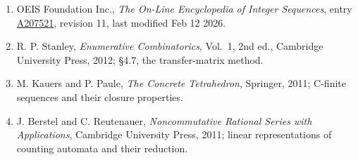 \documentclass[11pt]{article}
\theoremstyle{definition}
\begin{document}
\begin{enumerate}

\item OEIS Foundation Inc., \emph{The On-Line Encyclopedia of Integer Sequences}, entry \href{https://oeis.org/A207521}{A207521}, revision 11, last modified Feb 12 2026.

\item R. P. Stanley, \emph{Enumerative Combinatorics}, Vol.~1, 2nd ed., Cambridge University Press, 2012; \S4.7, the transfer-matrix method.

\item M. Kauers and P. Paule, \emph{The Concrete Tetrahedron}, Springer, 2011; C-finite sequences and their closure properties.

\item J. Berstel and C. Reutenauer, \emph{Noncommutative Rational Series with Applications}, Cambridge University Press, 2011; linear representations of counting automata and their reduction.

\end{enumerate}
\end{document}
